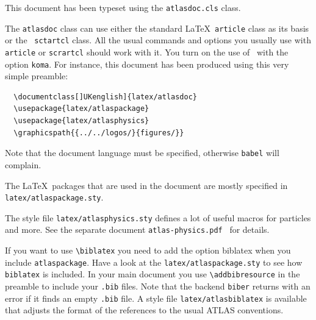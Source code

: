 \documentclass[UKenglish]{latex/atlasdoc}
\newcommand{\File}[1]{\texttt{#1}\xspace}
\newcommand{\Macro}[1]{\texttt{\textbackslash #1}\xspace}
\newcommand{\Option}[1]{\textsf{#1}\xspace}
\newcommand{\Package}[1]{\texttt{#1}\xspace}
\begin{document}
This document has been typeset using the \texttt{atlasdoc.cls} class.

The \texttt{atlasdoc} class can use either the standard \LaTeX\ \texttt{article} class
as its basis or the \KOMAScript\ \texttt{sctartcl} class.
All the usual commands and options you usually use
with \texttt{article}  or \texttt{scrartcl} should work with it. 
You turn on the use of \KOMAScript\ with the option \texttt{koma}.
For instance, this document has
been produced using this very simple preamble:
%
\begin{verbatim}
  \documentclass[]UKenglish]{latex/atlasdoc}
  \usepackage{latex/atlaspackage}
  \usepackage{latex/atlasphysics}
  \graphicspath{{../../logos/}{figures/}}
\end{verbatim}
%
Note that the document language must be specified, otherwise \texttt{babel} will complain.

The \LaTeX\ packages that are used in the document are mostly specified in 
\texttt{latex/atlaspackage.sty}.

The style file \texttt{latex/atlasphysics.sty} defines a lot of useful
macros for particles and more. See the separate document
\texttt{atlas-physics.pdf}~\cite{atlas-physics} for details.

If you want to use \Macro{biblatex} you need to add the option \Option{biblatex} when you
include \texttt{atlaspackage}.
Have a look at the \texttt{latex/atlaspackage.sty} to see how \texttt{biblatex} is included.
In your main document you use \Macro{addbibresource} in the preamble to include your \texttt{.bib} files.
Note that the backend \Package{biber} returns with an error if it finds an empty \texttt{.bib} file.
A style file \File{latex/atlasbiblatex} is available that adjusts the format of the references to the usual ATLAS conventions.
\end{document}
